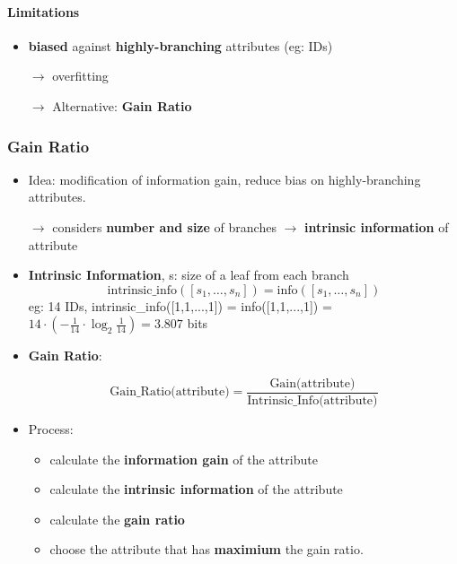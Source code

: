 \paragraph{Limitations}
\begin{itemize}
	\item \textbf{biased} against \textbf{highly-branching} attributes (eg: IDs)
	
	$\rightarrow$ overfitting
	
	$\rightarrow$ Alternative: \textbf{Gain Ratio}
\end{itemize}

\subsubsection{Gain Ratio}
\begin{itemize}
	\item Idea: modification of information gain, reduce bias on highly-branching attributes.
	
	$\rightarrow$ considers \textbf{number and size} of branches $\rightarrow$ \textbf{intrinsic information} of attribute
	
	\item \textbf{Intrinsic Information}, s: size of a leaf from each branch
	$$\text{intrinsic\_info}([s_1, \dots, s_n]) = \text{info}([s_1, \dots, s_n])$$
	eg: 14 IDs, intrinsic\_info([1,1,...,1]) = info([1,1,...,1]) = $14 \cdot (-\frac{1}{14} \cdot \log_{2} \frac{1}{14}) = 3.807$ bits 
	
	\item \textbf{Gain Ratio}: 
	
	$$\text{Gain\_Ratio(attribute)} = \dfrac{\text{Gain(attribute)}}{\text{Intrinsic\_Info(attribute)}}$$
	
	\item Process:
	\begin{itemize}
		\item calculate the \textbf{information gain} of the attribute
		\item calculate the \textbf{intrinsic information} of the attribute
		\item calculate the \textbf{gain ratio}
		\item choose the attribute that has \textbf{maximium} the gain ratio.
	\end{itemize}
\end{itemize}

